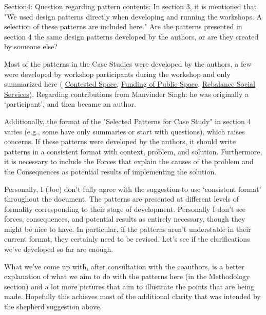 \documentclass[acmlarge,timestamp]{acmart}
\begin{document}
\begin{leftbubbles}
\label{Q:developed-by-authors} Section4: Question regarding pattern contents: In section 3, it is mentioned that "We used design patterns directly when developing and running the workshops. A selection of these patterns are included here." Are the patterns presented in section 4 the same design patterns developed by the authors, or are they created by someone else?
\end{leftbubbles}
\begin{rightbubbles}
Most of the patterns in the Case Studies were developed by the
authors, a few were developed by workshop participants during the
workshop and only summarized here ({\sc
  \hyperref[pat:contested-space]{Contested Space}}, {\sc
  \hyperref[pat:funding-of-public-space]{Funding of Public Space}},
{\sc \hyperref[{pat:rebalance-social-services}]{Rebalance Social
    Services}}).  Regarding contributions from Manvinder Singh: he was
originally a ‘participant’, and then became an author.
\end{rightbubbles}

\begin{leftbubbles}
Additionally, the format of the "Selected Patterns for Case Study" in
section 4 varies (e.g., some have only summaries or start with
questions), which raises concerns. If these patterns were developed by
the authors, it should write patterns in a consistent format with
context, problem, and solution. Furthermore, it is necessary to
include the Forces that explain the causes of the problem and the
Consequences as potential results of implementing the solution.
\end{leftbubbles}

\begin{rightbubbles}
Personally, I (Joe) don’t fully agree with the suggestion to use
‘consistent format’ throughout the document.  The patterns are
presented at different levels of formality corresponding to their
stage of development.  Personally I don’t see forces, consequences,
and potential results as entirely necessary, though they might be nice
to have.  In particular, if the patterns aren’t understable in their
current format, they certainly need to be revised.  Let’s see if the
clarifications we’ve developed so far are enough.

What we’ve come up with, after consultation with the coauthors, is a
better explanation of what we aim to do with the patterns here (in the
Methodology section) and a lot more pictures that aim to illustrate
the points that are being made.  Hopefully this achieves most of the
additional clarity that was intended by the shepherd suggestion above.
\end{rightbubbles}
\end{document}
